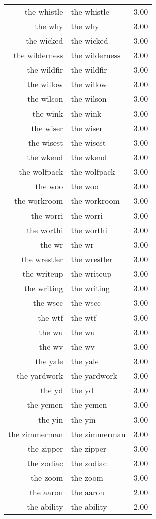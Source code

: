 \begin{table}[ht]
\begin{tabular}{rlr}
  the whistle & the whistle & 3.00 \\ 
  the why & the why & 3.00 \\ 
  the wicked & the wicked & 3.00 \\ 
  the wilderness & the wilderness & 3.00 \\ 
  the wildfir & the wildfir & 3.00 \\ 
  the willow & the willow & 3.00 \\ 
  the wilson & the wilson & 3.00 \\ 
  the wink & the wink & 3.00 \\ 
  the wiser & the wiser & 3.00 \\ 
  the wisest & the wisest & 3.00 \\ 
  the wkend & the wkend & 3.00 \\ 
  the wolfpack & the wolfpack & 3.00 \\ 
  the woo & the woo & 3.00 \\ 
  the workroom & the workroom & 3.00 \\ 
  the worri & the worri & 3.00 \\ 
  the worthi & the worthi & 3.00 \\ 
  the wr & the wr & 3.00 \\ 
  the wrestler & the wrestler & 3.00 \\ 
  the writeup & the writeup & 3.00 \\ 
  the writing & the writing & 3.00 \\ 
  the wscc & the wscc & 3.00 \\ 
  the wtf & the wtf & 3.00 \\ 
  the wu & the wu & 3.00 \\ 
  the wv & the wv & 3.00 \\ 
  the yale & the yale & 3.00 \\ 
  the yardwork & the yardwork & 3.00 \\ 
  the yd & the yd & 3.00 \\ 
  the yemen & the yemen & 3.00 \\ 
  the yin & the yin & 3.00 \\ 
  the zimmerman & the zimmerman & 3.00 \\ 
  the zipper & the zipper & 3.00 \\ 
  the zodiac & the zodiac & 3.00 \\ 
  the zoom & the zoom & 3.00 \\ 
  the aaron & the aaron & 2.00 \\ 
  the ability & the ability & 2.00 \\ 

\end{tabular}
\end{table}
